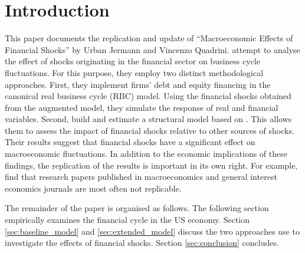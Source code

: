 \section{Introduction}
\label{sec:introduction}

This paper documents the replication and update of “Macroeconomic Effects of Financial Shocks” by Urban Jermann and Vincenzo Quadrini. \citeauthor{JERMANNfinancial} attempt to analyse the effect of shocks originating in the financial sector on business cycle fluctuations. For this purpose, they employ two distinct methodological approaches. First, they implement firms' debt and equity financing in the canonical real business cycle (RBC) model. Using the financial shocks obtained from the augmented model, they simulate the response of real and financial variables. Second, \citeauthor{JERMANNfinancial} build and estimate a structural model based on \citet{SMETSshocks}. This allows them to assess the impact of financial shocks relative to other sources of shocks. Their results suggest that financial shocks have a significant effect on macroeconomic fluctuations. In addition to the economic implications of these findings, the replication of the results is important in its own right. For example, \cite{CHANGeconomics} find that research papers published in macroeconomics and general interest economics journals are most often not replicable. 

The remainder of the paper is organised as follows. The following section empirically examines the financial cycle in the US economy. Section \ref{sec:baseline_model} and \ref{sec:extended_model} discuss the two approaches \citeauthor{JERMANNfinancial} use to investigate the effects of financial shocks. Section \ref{sec:conclusion} concludes.



